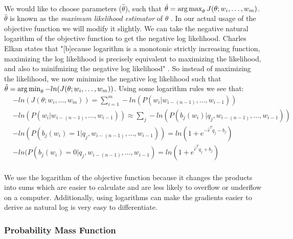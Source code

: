 \paragraph{}
We would like to choose parameters ($\hat{\theta}$), such that $\hat{\theta} = \operatorname*{arg\,max}_\theta J(\theta;w_i,\dots, w_m)$. $\hat{\theta}$ is known as the \emph{maximum likelihood estimator} of $\theta$ \cite{Elkan2013}.  In our actual usage of the objective function we will modify it slightly. We can take the negative natural logarithm of the objective function to get the negative log likelihood. Charles Elkan states that "[b]ecause logarithm is a monotonic strictly increasing function, maximizing the log likelihood is precisely equivalent to maximizing the likelihood, and also to minifmizing the negative log likelihood" \cite[pg. 3]{Elkan2013}. So instead of maximizing the likelihood, we now minimize the negative log likelihood such that  $\hat{\theta} = \operatorname*{arg\,min}_\theta -ln(J(\theta;w_i,\dots, w_m))$.
Using some logarithm rules we see that:
\begin{align}
&-ln(J(\theta;w_i,\dots, w_m)) = \sum_{i=1}^{m} -ln(P(w_i | w_{i-(n-1)},\dots, w_{i-1}))
\\
&-ln(P(w_i | w_{i-(n-1)},\dots, w_{i-1})) \approx \sum_j - ln(P(b_j(w_i) | q_j, w_{i-(n-1)},\dots, w_{i-1})) 
\\
&- ln(P(b_j(w_i) = 1 | q_j, w_{i-(n-1)},\dots, w_{i-1})) = ln (1 + e^{-\hat{r}^T q_{j} -b_{j}}) \nonumber
\\
&- ln(P(b_j(w_i) = 0 | q_j, w_{i-(n-1)},\dots, w_{i-1}) = ln (1 + e^{\hat{r}^T q_{j} +b_{j}}) \nonumber
\end{align}

\paragraph{}
We use the logarithm of the objective function because it changes the products into sums which are easier to calculate and are less likely to overflow or underflow on a computer. Additionally, using logarithms can make the gradients easier to derive as natural log is very easy to differentiate.


\subsubsection{Probability Mass Function}

